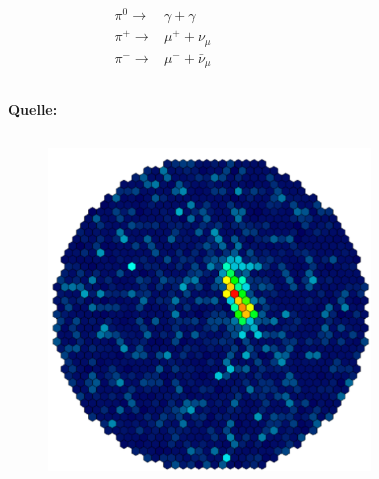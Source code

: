 \documentclass[aspectratio=1610, professionalfonts, 9pt]{beamer}
\begin{document}
\begin{frame}
\begin{columns}[onlytextwidth]
\begin{figure}
	\end{figure}
	\begin{eqnarray*}
	  \pi^{0} \rightarrow& \gamma + \gamma \\
	  \pi^{+} \rightarrow& \mu^{+} + \nu_{\mu} \\
	  \pi^{-} \rightarrow& \mu^{-} + \bar{\nu}_{\mu}
	\end{eqnarray*}
  \end{columns}
  {\tiny \textbf{Quelle:} \cite{corsika}}
\end{frame}

\begin{frame}
  \begin{columns}[onlytextwidth]
	\begin{figure}
	  \centering
	  \includegraphics[height=0.8\textheight]{./images/Gamma.pdf}
	\end{figure}
	\begin{figure}
	  \centering

\end{figure}
\end{columns}
\end{frame}
\end{document}
